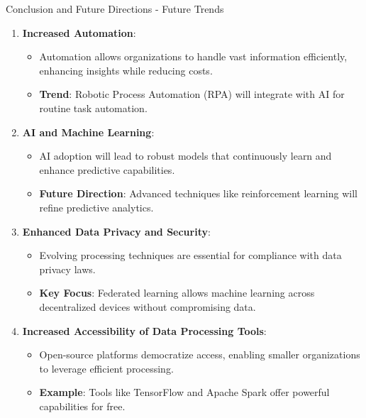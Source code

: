 \documentclass[aspectratio=169]{beamer}
\begin{document}
\begin{frame}[fragile]{Conclusion and Future Directions - Future Trends}
    \begin{enumerate}
        \item \textbf{Increased Automation}:
            \begin{itemize}
                \item Automation allows organizations to handle vast information efficiently, enhancing insights while reducing costs.
                \item \textbf{Trend}: Robotic Process Automation (RPA) will integrate with AI for routine task automation.
            \end{itemize}

        \item \textbf{AI and Machine Learning}:
            \begin{itemize}
                \item AI adoption will lead to robust models that continuously learn and enhance predictive capabilities.
                \item \textbf{Future Direction}: Advanced techniques like reinforcement learning will refine predictive analytics.
            \end{itemize}

        \item \textbf{Enhanced Data Privacy and Security}:
            \begin{itemize}
                \item Evolving processing techniques are essential for compliance with data privacy laws.
                \item \textbf{Key Focus}: Federated learning allows machine learning across decentralized devices without compromising data.
            \end{itemize}

        \item \textbf{Increased Accessibility of Data Processing Tools}:
            \begin{itemize}
                \item Open-source platforms democratize access, enabling smaller organizations to leverage efficient processing.
                \item \textbf{Example}: Tools like TensorFlow and Apache Spark offer powerful capabilities for free.
            \end{itemize}
    \end{enumerate}
\end{frame}
\end{document}
